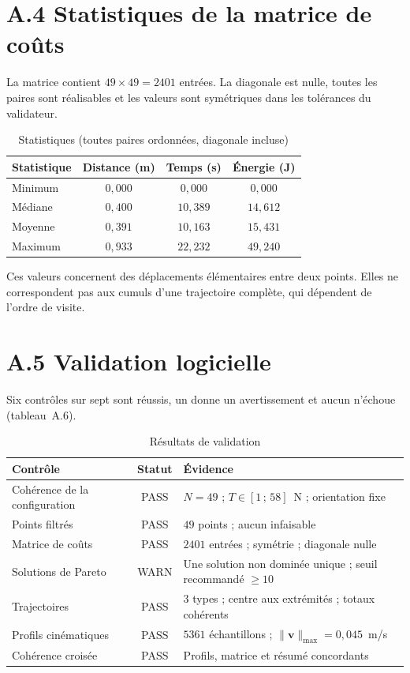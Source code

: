 \section*{A.4 Statistiques de la matrice de coûts}

La matrice contient $49 \times 49 = 2401$ entrées. La diagonale est nulle, toutes les paires sont réalisables et les valeurs sont symétriques dans les tolérances du validateur.

\begin{table}[H]
\centering
\caption{Statistiques (toutes paires ordonnées, diagonale incluse)}
\label{tab:A5}
\begin{tabular}{|l|c|c|c|}
\hline
\textbf{Statistique} & \textbf{Distance (m)} & \textbf{Temps (s)} & \textbf{Énergie (J)} \\
\hline
Minimum & $0{,}000$ & $0{,}000$ & $0{,}000$ \\
\hline
Médiane & $0{,}400$ & $10{,}389$ & $14{,}612$ \\
\hline
Moyenne & $0{,}391$ & $10{,}163$ & $15{,}431$ \\
\hline
Maximum & $0{,}933$ & $22{,}232$ & $49{,}240$ \\
\hline
\end{tabular}
\end{table}

Ces valeurs concernent des déplacements élémentaires entre deux points. Elles ne correspondent pas aux cumuls d'une trajectoire complète, qui dépendent de l'ordre de visite.

\section*{A.5 Validation logicielle}

Six contrôles sur sept sont réussis, un donne un avertissement et aucun n'échoue (tableau~A.6).

\begin{table}[H]
\centering
\caption{Résultats de validation}
\label{tab:A6}
\footnotesize
\begin{tabular}{|p{3.6cm}|c|p{7.2cm}|}
\hline
\textbf{Contrôle} & \textbf{Statut} & \textbf{Évidence} \\
\hline
Cohérence de la configuration & PASS & $N = 49$ ; $T \in [1\,;\, 58]$~N ; orientation fixe \\
\hline
Points filtrés & PASS & $49$ points ; aucun infaisable \\
\hline
Matrice de coûts & PASS & $2401$ entrées ; symétrie ; diagonale nulle \\
\hline
Solutions de Pareto & WARN & Une solution non dominée unique ; seuil recommandé $\geq 10$ \\
\hline
Trajectoires & PASS & $3$ types ; centre aux extrémités ; totaux cohérents \\
\hline
Profils cinématiques & PASS & $5361$ échantillons ; $\|\mathbf{v}\|_{\max} = 0{,}045$~m/s \\
\hline
Cohérence croisée & PASS & Profils, matrice et résumé concordants \\
\hline
\end{tabular}
\end{table}

